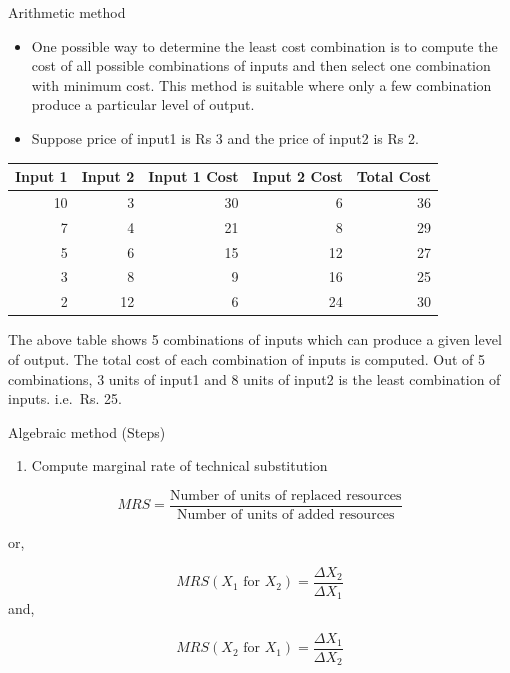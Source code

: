 \documentclass[12pt,ignorenonframetext,aspectratio=169]{beamer}
\providecommand{\tightlist}{%
  \setlength{\itemsep}{0pt}\setlength{\parskip}{0pt}}
\begin{document}
\begin{frame}{Arithmetic method}
\protect\hypertarget{arithmetic-method}{}
\begin{itemize}
\item
  One possible way to determine the least cost combination is to compute
  the cost of all possible combinations of inputs and then select one
  combination with minimum cost. This method is suitable where only a
  few combination produce a particular level of output.
\item
  Suppose price of input1 is Rs 3 and the price of input2 is Rs 2.
\end{itemize}

\begin{tabular}{rrrrr}
\toprule
Input 1 & Input 2 & Input 1 Cost & Input 2 Cost & Total Cost\\
\midrule
10 & 3 & 30 & 6 & 36\\
7 & 4 & 21 & 8 & 29\\
5 & 6 & 15 & 12 & 27\\
3 & 8 & 9 & 16 & 25\\
2 & 12 & 6 & 24 & 30\\
\bottomrule
\end{tabular}
\end{frame}

\begin{frame}{}
\protect\hypertarget{section-9}{}
The above table shows 5 combinations of inputs which can produce a given
level of output. The total cost of each combination of inputs is
computed. Out of 5 combinations, 3 units of input1 and 8 units of input2
is the least combination of inputs. i.e.~Rs. 25.
\end{frame}

\begin{frame}{Algebraic method (Steps)}
\protect\hypertarget{algebraic-method-steps}{}
\begin{enumerate}
\tightlist
\item
  Compute marginal rate of technical substitution
\end{enumerate}

\[MRS = \frac{\textrm{Number of units of replaced resources}}{\textrm{Number of units of added resources}}\]

or,

\[MRS(X_1 \textrm{ for } X_2) = \frac{\Delta X_2}{\Delta X_1}\] and,

\[MRS(X_2 \textrm{ for } X_1) = \frac{\Delta X_1}{\Delta X_2}\]
\end{frame}
\end{document}

